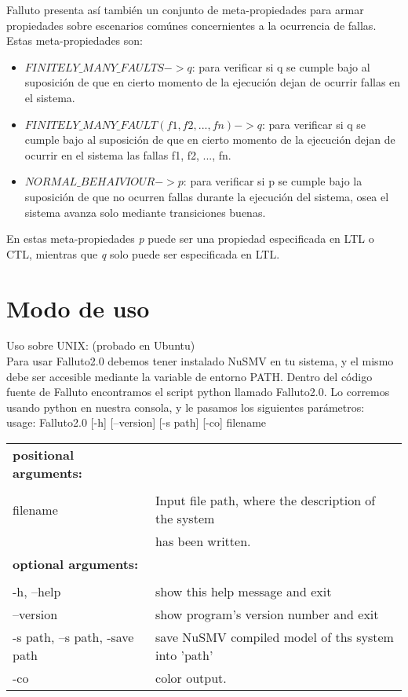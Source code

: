 \documentclass[titlepage, 12pt]{book}
\begin{document}
Falluto presenta as\'i tambi\'en un conjunto de meta-propiedades para armar propiedades sobre escenarios com\'unes concernientes a la ocurrencia de fallas. Estas meta-propiedades son:
\begin{itemize}
\item $FINITELY\_MANY\_FAULTS -> q$: para verificar si q se cumple bajo al suposici\'on de que en cierto momento de la ejecuci\'on dejan de ocurrir fallas en el sistema.
\item $FINITELY\_MANY\_FAULT(f1, f2, ..., fn) -> q$: para verificar si q se cumple bajo al suposici\'on de que en cierto momento de la ejecuci\'on dejan de ocurrir en el sistema las fallas f1, f2, ..., fn.
\item $NORMAL\_BEHAIVIOUR -> p$: para verificar si p se cumple bajo la suposici\'on de que no ocurren fallas durante la ejecuci\'on del sistema, osea el sistema avanza solo mediante transiciones buenas.
\end{itemize}
En estas meta-propiedades \textit{p} puede ser una propiedad especificada en LTL o CTL, mientras que \textit{q} solo puede ser especificada en LTL.





\chapter{Modo de uso}
Uso sobre UNIX: (probado en Ubuntu)\\

Para usar Falluto2.0 debemos tener instalado NuSMV en tu sistema, y el mismo debe ser accesible mediante la variable de entorno PATH. Dentro del c\'odigo fuente de Falluto encontramos el script python llamado Falluto2.0. Lo corremos usando python en nuestra consola, y le pasamos los siguientes par\'ametros:\\

\noindent usage: Falluto2.0 [-h] [--version] [-s path] [-co] filename\\


\begin{tabular}{ll}
\textbf{positional arguments:}\\\\
filename & Input file path, where the description of the system\\
         & has been written.\\
\textbf{optional arguments:} & \\\\
-h, --help          & show this help message and exit\\
--version           & show program's version number and exit\\
-s path, --s path, -save path & save NuSMV compiled model of ths system into 'path'\\
-co 		        & color output.\\
\end{tabular}
\end{document}
